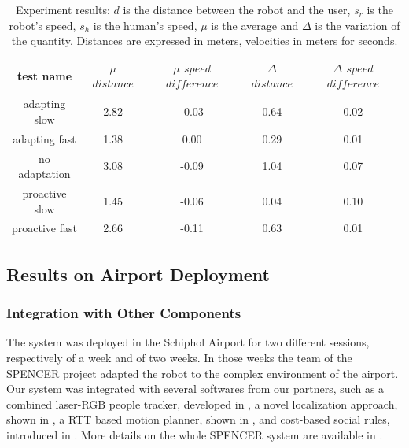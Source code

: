 \begin{table}
\caption{Experiment results: $d$ is the distance between the robot and the user, $s_r$ is the robot's speed, $s_h$ is the human's speed, $\mu$ is the average and $\Delta$ is the variation of the quantity. Distances are expressed in meters, velocities in meters for seconds.}
\centering
\begin{tabular}{ | c | c | c | c | c | }

\hline
  test name     & $\mu$ $distance$ & $\mu$ $speed$ $difference$ & $\Delta$ $distance$ & $\Delta$ $speed$ $difference$ \\
\hline
adapting slow & 2.82 & -0.03 & 0.64 & 0.02 \\
  \hline
  adapting fast & 1.38 & 0.00 & 0.29 & 0.01 \\
  \hline
  no adaptation & 3.08 & -0.09 & 1.04 & 0.07 \\
\hline
proactive slow & 1.45 & -0.06 & 0.04 & 0.10 \\
\hline
proactive fast & 2.66 & -0.11 & 0.63 & 0.01 \\
\hline
\end{tabular}
\label{table:case-study-spencer-experiment_results}
\end{table}

\subsection{Results on Airport Deployment}
\label{subsec:case_study-spencer-airport}
\subsubsection{Integration with Other Components}
The system was deployed in the Schiphol Airport for two different sessions, respectively of a week and of two weeks. In those weeks the team of the SPENCER project adapted the robot to the complex environment of the airport. Our system was integrated with several softwares from our partners, such as a combined laser-RGB people tracker, developed in \cite{lindermulti}, a novel localization approach, shown in \cite{kucner2015ndt}, a RTT based motion planner, shown in \cite{palmierirrt}, and cost-based social rules, introduced in \cite{okallearning}. More details on the whole SPENCER system are available in \cite{triebel2015spencer}.


